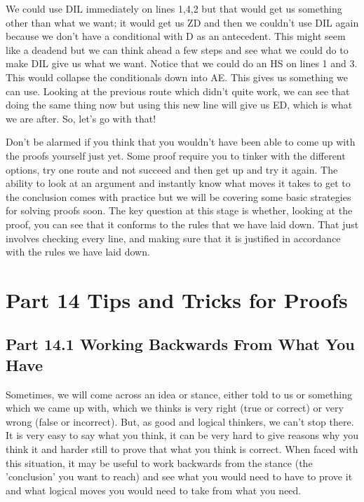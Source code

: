 We could use DIL immediately on lines 1,4,2 but that would get us something other than what we want; it would get us Z\eor D and then we couldn't use DIL again because we don't have a conditional with D as an antecedent. This might seem like a deadend but we can think ahead a few steps and see what we could do to make DIL give us what we want. Notice that we could do an HS on lines 1 and 3. This would collapse the conditionals down into A\eif E. This gives us something we can use. Looking at the previous route which didn't quite work, we can see that doing the same thing now but using this new line will give us E\eor D, which is what we are after. So, let's go with that!
\begin{fitchproof}
 
 
\end{fitchproof}

Don’t be alarmed if you think that you wouldn’t have been able to come up with the proofs yourself just yet. Some proof require you to tinker with the different options, try one route and not succeed and then get up and try it again. The ability to look at an argument and instantly know what moves it takes to get to the conclusion comes with practice but we will be covering some basic strategies for solving proofs soon. The key question at this stage is whether, looking at the proof, you can see that it conforms to the rules that we have laid down. That just involves checking every line, and making sure that it is justified in accordance with the rules we have laid down.
\chapter{Part 14 Tips and Tricks for Proofs}
\section{Part 14.1 Working Backwards From What You Have}
Sometimes, we will come across an idea or stance, either told to us or something which we came up with, which we thinks is very right (true or correct) or very wrong (false or incorrect). But, as good and logical thinkers, we can't stop there. It is very easy to say what you think, it can be very hard to give reasons why you think it and harder still to prove that what you think is correct. When faced with this situation, it may be useful to work backwards from the stance (the 'conclusion' you want to reach) and see what you would need to have to prove it and what logical moves you would need to take from what you need. 

